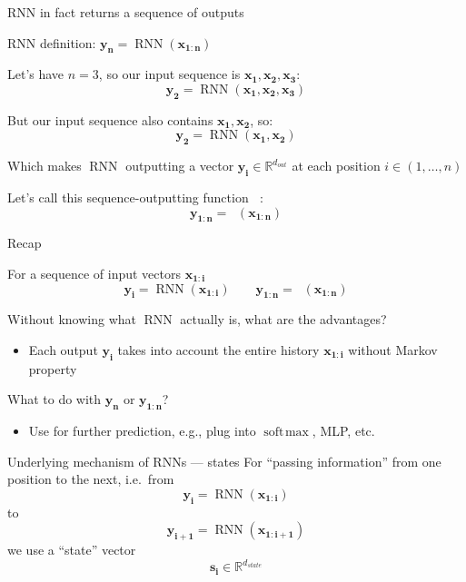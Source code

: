 \documentclass[12pt,aspectratio=169,handout]{beamer}
\DeclareMathOperator*{\softmax}{soft\!\max}
\DeclareMathOperator*{\rnn}{RNN}
\DeclareMathOperator*{\rnnstar}{RNN^{*}}
\begin{document}
	
	\begin{frame}{RNN in fact returns a sequence of outputs}
		
		RNN definition: $\bm{y_n} = \rnn (\bm{x_{1:n}})$
		
		Let's have $n = 3$, so our input sequence is $\bm{x_{1}}, \bm{x_2}, \bm{x_3}$:
		$$
		\bm{y_2} = \rnn (\bm{x_{1}}, \bm{x_2}, \bm{x_3})
		$$
		
		\pause
		
		But our input sequence also contains $\bm{x_{1}}, \bm{x_2}$, so:
		$$
		\bm{y_2} = \rnn (\bm{x_{1}}, \bm{x_2})
		$$
		
		Which makes $\rnn$ outputting a vector $\bm{y_i} \in \mathbb{R}^{d_{out}}$ at each position $i \in (1, \ldots, n)$
		
		Let's call this sequence-outputting function $\rnnstar$:
		$$
		\bm{y_{1:n}} = \rnnstar (\bm{x_{1:n}})
		$$
		
	\end{frame}
	
	
	
	\begin{frame}{Recap}
		
		For a sequence of input vectors  $\bm{x_{1:i}}$
		$$
		\bm{y_i} = \rnn (\bm{x_{1:i}}) \qquad
		\bm{y_{1:n}} = \rnnstar (\bm{x_{1:n}})
		$$
		
		\pause
		
		Without knowing what $\rnn$ actually is, what are the advantages?
		\pause
		\begin{itemize}
			\item Each output $\bm{y_i}$ takes into account the entire history $\bm{x_{1:i}}$ without Markov property
		\end{itemize}
		
		What to do with $\bm{y_n}$ or $\bm{y_{1:n}}$?
		\pause
		\begin{itemize}
			\item Use for further prediction, e.g., plug into $\softmax$, MLP, etc.
		\end{itemize}
		
	\end{frame}
	
	
	\begin{frame}{Underlying mechanism of RNNs --- states}
		For ``passing information'' from one position to the next, i.e.\ from
		$$\bm{y_i} = \rnn (\bm{x_{1:i}})$$
		to
		$$\bm{y_{i+1}} = \rnn (\bm{x_{1:i+1}})$$
		we use a ``state'' vector
		$$\bm{s_i} \in \mathbb{R}^{d_{state}}$$
	\end{frame}
	
\end{document}
